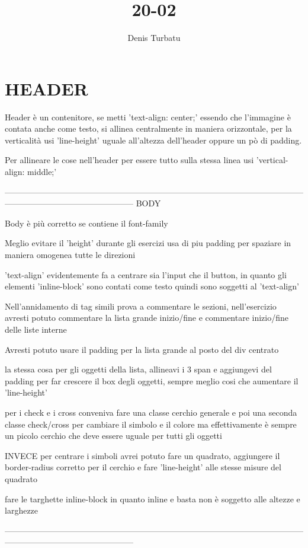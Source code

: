 \documentclass{article}
\title{20-02}
\author{Denis Turbatu}
\begin{document}
\section*{HEADER}

Header è un contenitore, se metti 'text-align: center;' essendo che l'immagine è contata anche come testo, si allinea centralmente in maniera orizzontale, per la verticalità usi 'line-height' uguale all'altezza dell'header oppure un pò di padding.

Per allineare le cose nell'header per essere tutto sulla stessa linea usi 'vertical-align: middle;'

-----------------------------------------------------------------------------------------------------------------------------------------------------------
BODY

Body è più corretto se contiene il font-family

Meglio evitare il 'height' durante gli esercizi usa di piu padding per spaziare in maniera omogenea tutte le direzioni

'text-align' evidentemente fa a centrare sia l'input che il button,
in quanto gli elementi 'inline-block' sono contati come testo quindi sono soggetti al 'text-align' 

Nell'annidamento di tag simili prova a commentare le sezioni, nell'esercizio avresti potuto commentare la lista grande inizio/fine e commentare inizio/fine delle liste interne

Avresti potuto usare il padding per la lista grande al posto del div centrato

la stessa cosa per gli oggetti della lista, allineavi i 3 span e aggiungevi del padding per far crescere il box degli oggetti, sempre meglio cosi che aumentare il 'line-height'

per i check e i cross conveniva fare una classe cerchio generale e poi una seconda classe check/cross per cambiare il simbolo e il colore ma effettivamente è sempre un picolo cerchio che deve essere uguale per tutti gli oggetti

INVECE per centrare i simboli avrei potuto fare un quadrato, aggiungere il border-radius corretto per il cerchio e fare 'line-height' alle stesse misure del quadrato

fare le targhette inline-block in quanto inline e basta non è soggetto alle altezze e larghezze 

-----------------------------------------------------------------------------------------------------------------------------------------------------------
\end{document}

